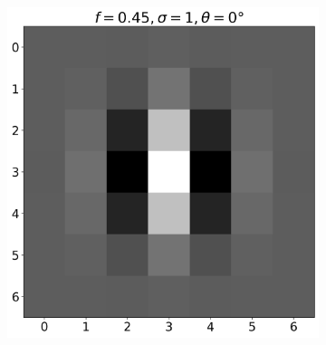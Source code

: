 \documentclass[12pt,a4paper, english]{article}
\begin{document}
\begin{figure}[!htbp]
\begin{subfigure}[b]{0.3\textwidth}
      \end{subfigure}
      \begin{subfigure}[b]{0.3\textwidth}
        \includegraphics[width=\textwidth]{img/K2.png}
      \end{subfigure}


\end{figure}
\end{document}
